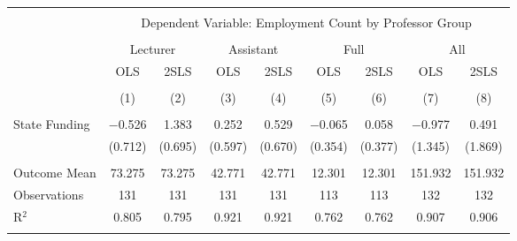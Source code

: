 
\begin{tabular}{@{\extracolsep{5pt}}lcccccccc} 
\\[-1.8ex]\hline 
\hline \\[-1.8ex] 
 & \multicolumn{8}{c}{Dependent Variable: Employment Count by Professor Group} \\ 
\cline{2-9} 
\\[-1.8ex] & \multicolumn{2}{c}{Lecturer} & \multicolumn{2}{c}{Assistant} & \multicolumn{2}{c}{Full} & \multicolumn{2}{c}{All} \\ 
 & OLS & 2SLS & OLS & 2SLS & OLS & 2SLS & OLS & 2SLS \\ 
\\[-1.8ex] & (1) & (2) & (3) & (4) & (5) & (6) & (7) & (8)\\ 
\hline \\[-1.8ex] 
 State Funding & $-$0.526 & 1.383 & 0.252 & 0.529 & $-$0.065 & 0.058 & $-$0.977 & 0.491 \\ 
  & (0.712) & (0.695) & (0.597) & (0.670) & (0.354) & (0.377) & (1.345) & (1.869) \\ 
 \hline \\[-1.8ex] 
Outcome Mean & 73.275 & 73.275 & 42.771 & 42.771 & 12.301 & 12.301 & 151.932 & 151.932 \\ 
Observations & 131 & 131 & 131 & 131 & 113 & 113 & 132 & 132 \\ 
R$^{2}$ & 0.805 & 0.795 & 0.921 & 0.921 & 0.762 & 0.762 & 0.907 & 0.906 \\ 
\hline 
\hline \\[-1.8ex] 
\end{tabular} 
